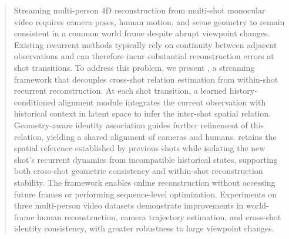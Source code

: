 \begin{abstract}
Streaming multi-person 4D reconstruction from multi-shot monocular video
requires camera poses, human motion, and scene geometry to remain consistent
in a common world frame despite abrupt viewpoint changes. Existing recurrent
methods typically rely on continuity between adjacent observations and can
therefore incur substantial reconstruction errors at shot transitions. To
address this problem, we present \textbf{\method{}}, a streaming framework that
decouples cross-shot relation estimation from within-shot recurrent
reconstruction. At each shot transition, a learned history-conditioned
alignment module integrates the current observation with historical context in
latent space to infer the inter-shot spatial relation. Geometry-aware identity
association guides further refinement of this relation, yielding a shared
alignment of cameras and humans. \method{} retains the spatial reference
established by previous shots while isolating the new shot's recurrent dynamics
from incompatible historical states, supporting both cross-shot geometric
consistency and within-shot reconstruction stability. The framework enables
online reconstruction without accessing future frames or performing
sequence-level optimization. Experiments on three multi-person video datasets
demonstrate improvements in world-frame human reconstruction, camera trajectory
estimation, and cross-shot identity consistency, with greater robustness to
large viewpoint changes.
\end{abstract}
